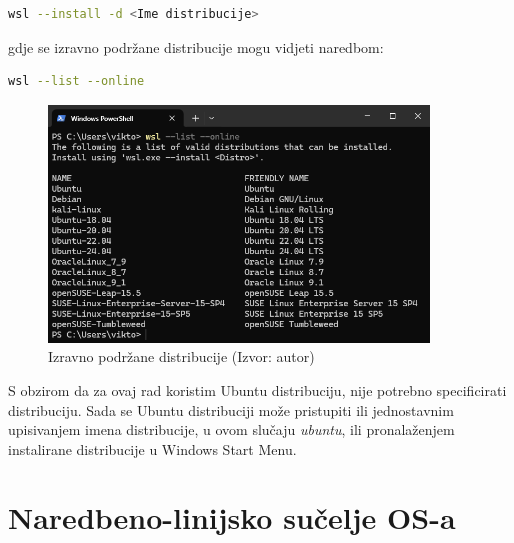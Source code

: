 \documentclass{foi}
\begin{document}
\begin{lstlisting}[language=bash]
wsl --install -d <Ime distribucije>
\end{lstlisting}

\begin{flushleft}gdje se izravno podržane distribucije mogu vidjeti naredbom:\end{flushleft}

\begin{lstlisting}[language=bash]
wsl --list --online
\end{lstlisting}

\begin{figure}[H]
    \centering
    \includegraphics[width=0.9\textwidth]{slike/lista_distribucija.png}
    \caption{Izravno podržane distribucije (Izvor: autor)}
    \label{fig:distribucije}
\end{figure}

\begin{flushleft}S obzirom da za ovaj rad koristim Ubuntu distribuciju, nije potrebno specificirati distribuciju. Sada se Ubuntu distribuciji može pristupiti ili jednostavnim upisivanjem imena distribucije, u ovom slučaju \textit{ubuntu}, ili pronalaženjem instalirane distribucije u Windows Start Menu.\end{flushleft}


\chapter{Naredbeno-linijsko sučelje OS-a}
\end{document}
